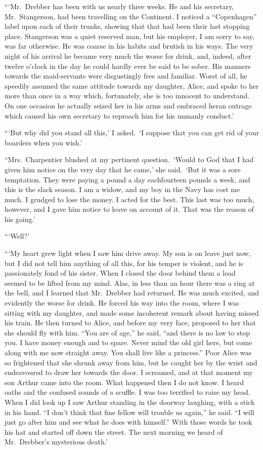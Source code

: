 \documentclass[12pt,english]{book}
\begin{document}
{}```Mr.\ Drebber has been with us nearly three weeks. He and his
secretary, Mr.\ Stangerson, had been travelling on the Continent.
I noticed a {}``Copenhagen'' label upon each of their trunks, showing
that that had been their last stopping place. Stangerson was a quiet
reserved man, but his employer, I am sorry to say, was far otherwise.
He was coarse in his habits and brutish in his ways. The very night
of his arrival he became very much the worse for drink, and, indeed,
after twelve o'clock in the day he could hardly ever be said to be
sober. His manners towards the maid-servants were disgustingly free
and familiar. Worst of all, he speedily assumed the same attitude
towards my daughter, Alice, and spoke to her more than once in a way
which, fortunately, she is too innocent to understand. On one occasion
he actually seized her in his arms and embraced her\mdsh{---}an outrage
which caused his own secretary to reproach him for his unmanly conduct.'

{}```But why did you stand all this,' I asked.\  `I suppose that
you can get rid of your boarders when you wish.'

{}``Mrs.\ Charpentier blushed at my pertinent question.\  `Would
to God that I had given him notice on the very day that he came,'
she said.\  `But it was a sore temptation. They were paying a pound
a day each\mdsh{---}fourteen pounds a week, and this is the slack
season. I am a widow, and my boy in the Navy has cost me much. I grudged
to lose the money. I acted for the best. This last was too much, however,
and I gave him notice to leave on account of it. That was the reason
of his going.'

{}```Well?'

{}```My heart grew light when I saw him drive away. My son is on
leave just now, but I did not tell him anything of all this, for his
temper is violent, and he is passionately fond of his sister. When
I closed the door behind them a load seemed to be lifted from my mind.
Alas, in less than an hour there was a ring at the bell, and I learned
that Mr.\ Drebber had returned. He was much excited, and evidently
the worse for drink. He forced his way into the room, where I was
sitting with my daughter, and made some incoherent remark about having
missed his train. He then turned to Alice, and before my very face,
proposed to her that she should fly with him. {}``You are of age,''
he said, {}``and there is no law to stop you. I have money enough
and to spare. Never mind the old girl here, but come along with me
now straight away. You shall live like a princess.'' Poor Alice was
so frightened that she shrunk away from him, but he caught her by
the wrist and endeavoured to draw her towards the door. I screamed,
and at that moment my son Arthur came into the room. What happened
then I do not know. I heard oaths and the confused sounds of a scuffle.
I was too terrified to raise my head. When I did look up I saw Arthur
standing in the doorway laughing, with a stick in his hand. {}``I
don't think that fine fellow will trouble us again,'' he said. {}``I
will just go after him and see what he does with himself.'' With
those words he took his hat and started off down the street. The next
morning we heard of Mr.\ Drebber's mysterious death.'
\end{document}
